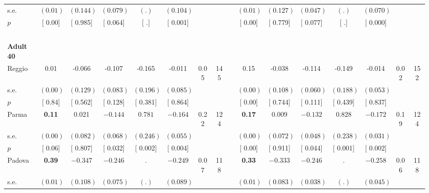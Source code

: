 \begin{longtable}{L{8em} c c c c c c c p{1em} c c c c c c c}
\quad \quad \quad \quad s.e.& $ (     0.01)$ & $ (    0.144)$ & $ (    0.079)$ & $ (        .)$ & $ (    0.104)$ & & & & $ (     0.01)$ & $ (    0.127)$ & $ (    0.047)$ & $ (        .)$ & $ (    0.070)$ & &  \\*
\quad \quad \quad \quad $ p$ & [     0.00] & [    0.985] & [    0.064] & [        .] & [    0.001] & & & & [     0.00] & [    0.779] & [    0.077] & [        .] & [    0.000] & &  \\[1em]
~\\[1em]
\quad \quad \textbf{Adult 40} & & & & & & & & & & & & & & & \\* 
\quad \quad \quad Reggio& 0.01 &    -0.066 &    -0.107 &    -0.165 &    -0.011 &      0.05 &       145 & & 0.15 &    -0.038 &    -0.114 &    -0.149 &    -0.014 &      0.02 &       152  \\*
\quad \quad \quad \quad s.e.& $ (     0.00)$ & $ (    0.129)$ & $ (    0.083)$ & $ (    0.196)$ & $ (    0.085)$ & & & & $ (     0.00)$ & $ (    0.108)$ & $ (    0.060)$ & $ (    0.188)$ & $ (    0.053)$ & &  \\*
\quad \quad \quad \quad $ p$ & [     0.84] & [    0.562] & [    0.128] & [    0.381] & [    0.864] & & & & [     0.00] & [    0.744] & [    0.111] & [    0.439] & [    0.837] & &  \\[1em]
\quad \quad \quad Parma& \textbf{     0.11} &     0.021 & $ \mathbf{   -0.144}$ & $ \mathbf{    0.781}$ & $ \mathbf{   -0.164}$ &      0.22 &       124 & & \textbf{     0.17} &     0.009 & $ \mathbf{   -0.132}$ & $ \mathbf{    0.828}$ & $ \mathbf{   -0.172}$ &      0.19 &       124  \\*
\quad \quad \quad \quad s.e.& $ (     0.00)$ & $ (    0.082)$ & $ (    0.068)$ & $ (    0.246)$ & $ (    0.055)$ & & & & $ (     0.00)$ & $ (    0.072)$ & $ (    0.048)$ & $ (    0.238)$ & $ (    0.031)$ & &  \\*
\quad \quad \quad \quad $ p$ & [     0.06] & [    0.807] & [    0.032] & [    0.002] & [    0.004] & & & & [     0.00] & [    0.911] & [    0.044] & [    0.001] & [    0.002] & &  \\[1em]
\quad \quad \quad Padova& \textbf{     0.39} & $ \mathbf{   -0.347}$ & $ \mathbf{   -0.246}$ &         . & $ \mathbf{   -0.249}$ &      0.07 &       118 & & \textbf{     0.33} & $ \mathbf{   -0.333}$ & $ \mathbf{   -0.246}$ &         . & $ \mathbf{   -0.258}$ &      0.06 &       118  \\*
\quad \quad \quad \quad s.e.& $ (     0.01)$ & $ (    0.108)$ & $ (    0.075)$ & $ (        .)$ & $ (    0.089)$ & & & & $ (     0.01)$ & $ (    0.083)$ & $ (    0.038)$ & $ (        .)$ & $ (    0.045)$ & &  \\*

\end{longtable}
